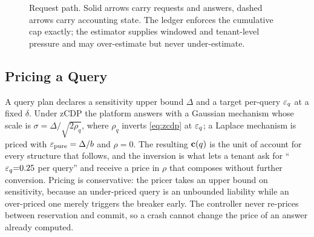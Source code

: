 \begin{figure}[t]
\caption{Request path. Solid arrows carry requests and answers, dashed arrows carry
accounting state. The ledger enforces the cumulative cap exactly; the estimator
supplies windowed and tenant-level pressure and may over-estimate but never
under-estimate.}
\label{fig:arch}
\end{figure}

\subsection{Pricing a Query}
\label{sec:design-price}

A query plan declares a sensitivity upper bound $\Delta$ and a target
per-query $\varepsilon_q$ at a fixed $\delta$. Under zCDP the platform answers with a
Gaussian mechanism whose scale is $\sigma=\Delta/\sqrt{2\rho_q}$, where $\rho_q$
inverts \eqref{eq:zcdp} at $\varepsilon_q$; a Laplace mechanism is priced with
$\varepsilon_{\mathrm{pure}}=\Delta/b$ and $\rho=0$. The resulting $\mathbf{c}(q)$ is the unit
of account for every structure that follows, and the inversion is what lets a
tenant ask for ``$\varepsilon_q{=}0.25$ per query'' and receive a price in $\rho$ that
composes without further conversion. Pricing is conservative: the pricer takes an upper bound on sensitivity, because
an under-priced query is an unbounded liability while an over-priced one merely
triggers the breaker early. The controller never re-prices between reservation and
commit, so a crash cannot change the price of an answer already computed.
